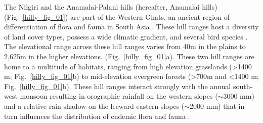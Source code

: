 The Nilgiri and the Anamalai-Palani hills (hereafter, Anamalai hills) (Fig.~\ref{hilly_fig_01}) are part of the Western Ghats, an ancient region of differentiation of flora and fauna in South Asia \citep{mani1974,myers2000,vijayakumar2016}.
These hill ranges host a diversity of land cover types, possess a wide climatic gradient, and several bird species \citep{ali1983,das2006}.
The elevational range across these hill ranges varies from 40m in the plains to 2,625m in the higher elevations.
(Fig.~\ref{hilly_fig_01}a).
These two hill ranges are home to a multitude of habitats, ranging from high elevation grasslands (>1400 m; Fig.~\ref{hilly_fig_01}b) to mid-elevation evergreen forests (>700m and <1400 m; Fig.~\ref{hilly_fig_01}b).
These hill ranges interact strongly with the annual south-west monsoon resulting in orographic rainfall on the western slopes ($\sim$3000 mm) and a relative rain-shadow on the leeward eastern slopes ($\sim$2000 mm) that in turn influences the distribution of endemic flora and fauna \citep{gadgil1986,pascal1988,robin2015}.

